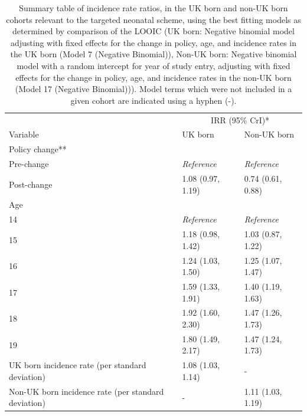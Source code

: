\documentclass[11pt,twoside]{bristolthesis}
\begin{document}
  \begin{table}[!h]
  
  \caption{\label{tab:07-universal-tab}Summary table of incidence rate ratios, in the UK born and non-UK born cohorts relevant to the targeted neonatal scheme, using the best fitting models as determined by comparison of the LOOIC (UK born: Negative binomial model adjusting with fixed effects for the change in policy, age, and incidence rates in the UK born (Model 7 (Negative Binomial)), Non-UK born: Negative binomial model with a random intercept for year of study entry, adjusting with fixed effects for the change in policy, age, and incidence rates in the non-UK born (Model 17 (Negative Binomial))). Model terms which were not included in a given cohort are indicated using a hyphen (-).}
  \centering
  \fontsize{8}{10}\selectfont
  \begin{tabular}{lll}
  \toprule
  \multicolumn{1}{c}{ } & \multicolumn{2}{c}{IRR (95\% CrI)*} \\
  \cmidrule(l{3pt}r{3pt}){2-3}
  Variable & UK born & Non-UK born\\
  \midrule
  Policy change** &  & \\
  \hspace{1em}Pre-change & \em{Reference} & \em{Reference}\\
  \hspace{1em}Post-change & 1.08 (0.97, 1.19) & 0.74 (0.61, 0.88)\\
  Age &  & \\
  \hspace{1em}14 & \em{Reference} & \em{Reference}\\
  \addlinespace
  \hspace{1em}15 & 1.18 (0.98, 1.42) & 1.03 (0.87, 1.22)\\
  \hspace{1em}16 & 1.24 (1.03, 1.50) & 1.25 (1.07, 1.47)\\
  \hspace{1em}17 & 1.59 (1.33, 1.91) & 1.40 (1.19, 1.63)\\
  \hspace{1em}18 & 1.92 (1.60, 2.30) & 1.47 (1.26, 1.73)\\
  \hspace{1em}19 & 1.80 (1.49, 2.17) & 1.47 (1.24, 1.73)\\
  \addlinespace
  UK born incidence rate (per standard deviation) & 1.08 (1.03, 1.14) & -\\
  Non-UK born incidence rate (per standard deviation) & - & 1.11 (1.03, 1.19)\\

\end{tabular}
\end{table}
\end{document}
